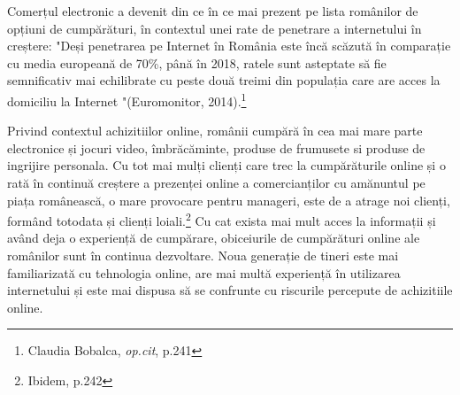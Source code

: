 \documentclass[a4paper, 12pt]{article}
\begin{document}
	\qquad Comerțul electronic a devenit din ce în ce mai prezent pe lista românilor de opțiuni de cumpărături, în contextul unei rate de penetrare a internetului în creștere: "Deși penetrarea pe Internet în România este încă scăzută în comparație cu media europeană de 70\%, până în 2018, ratele sunt asteptate să fie semnificativ mai echilibrate cu peste două treimi din populația care are acces la domiciliu la Internet "(Euromonitor, 2014).\footnote{Claudia Bobalca, \textit{op.cit}, p.241}
	
	\quad Privind contextul achizitiilor online, românii cumpără în cea mai mare parte electronice și jocuri video, îmbrăcăminte, produse de frumusete si produse de ingrijire personala. Cu tot mai mulți clienți care trec la cumpărăturile online și o rată în continuă creștere a prezenței online a comercianților cu amănuntul pe piața românească, o mare provocare pentru manageri, este de a atrage noi clienți, formând  totodata și clienți loiali.\footnote{Ibidem, p.242} Cu cat exista mai mult acces la informații și având deja o experiență de cumpărare, obiceiurile de cumpărături online ale românilor sunt în continua dezvoltare. Noua generație de tineri este mai familiarizată cu tehnologia online, are mai multă experiență în utilizarea internetului și este mai dispusa să se confrunte cu riscurile percepute de achizitiile online.
	
\end{document}
